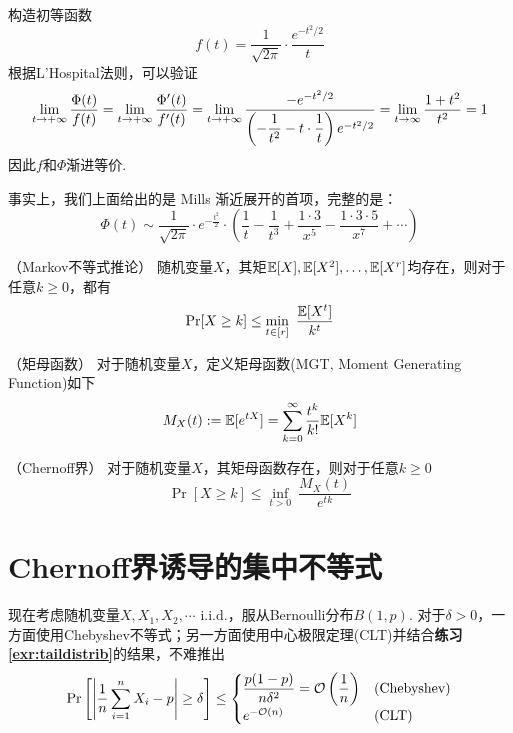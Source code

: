 \begin{solution}
构造初等函数 
\[
f(t) = \dfrac{1}{\sqrt{2\pi}} \cdot \dfrac{e^{-t^2/2}}{t}
\]
根据L'Hospital法则，可以验证
\[
\lim_{t\rightarrow +\infty} \dfrac{\Phi(t)}{f(t)} = \lim_{t \rightarrow +\infty} \dfrac{\Phi'(t)}{f'(t)} = \lim_{t \rightarrow +\infty} \dfrac{-e^{-t^2/2}}{\left(-\dfrac{1}{t^2} - t\cdot \dfrac{1}{t}\right) e^{-t^2/2}} = \lim_{t\rightarrow \infty}\dfrac{1+t^2}{t^2} = 1
\]
因此$f$和$\Phi$渐进等价. 
\end{solution}

事实上，我们上面给出的是 Mills 渐近展开的首项，完整的是：
\[
\Phi(t) \sim \dfrac{1}{\sqrt{2\pi}} \cdot {e^{-\frac{t^2}{2}}}
\cdot \left(
    \dfrac{1}{t} - \dfrac{1}{t^3} + \dfrac{1 \cdot 3}{x^5} - \dfrac{1 \cdot 3 \cdot 5}{x^7} + \cdots
\right)
\]

\begin{corollary}（Markov不等式推论）
    随机变量$X$，其矩$\mathbb{E}[X], \mathbb{E}[X^2], \dots, \mathbb{E}[X^r]$均存在，则对于任意$k \ge 0$，都有 
    \[
    \Pr[X \ge k] \le \min_{t\in [r]}\ \dfrac{\E[X^t]}{k^t}
    \]
\end{corollary}

\begin{definition}（矩母函数）
    对于随机变量$X$，定义矩母函数(MGT, Moment Generating Function)如下
    \[
    M_X(t) := \mathbb{E}[e^{tX}] = \sum_{k=0}^{\infty} \dfrac{t^k}{k!} \mathbb{E}[X^k]
    \]
\end{definition}

\begin{theorem}（Chernoff界）
     对于随机变量$X$，其矩母函数存在，则对于任意$k\ge 0$
    \[
     \Pr[X \ge k] \le \inf_{t > 0} \ \dfrac{M_X(t)}{e^{tk}}
    \]
\end{theorem}

\section{Chernoff界诱导的集中不等式}

现在考虑随机变量$X, X_1, X_2, \cdots$ i.i.d.，服从Bernoulli分布$B(1,p)$. 对于$\delta > 0$，一方面使用Chebyshev不等式；另一方面使用中心极限定理(CLT)并结合\textbf{练习\ref{exr:taildistrib}}的结果，不难推出
\[
\Pr\left[
    \left\vert
        \dfrac 1n \sum_{i=1}^n X_i - p
    \right\vert \ge \delta
\right] \le \begin{cases}
\dfrac{p(1-p)}{n\delta^2} = \mathcal{O}\left(\dfrac 1n \right) & \text{(Chebyshev)} \\
e^{-\mathcal{O}(n)} & \text{(CLT)}
\end{cases}
\]

